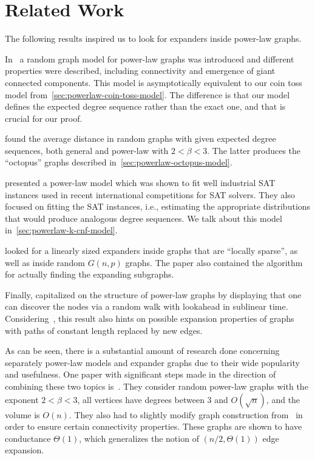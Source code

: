 \section{Related Work}

The following results inspired us to look for expanders inside power-law graphs.

In~\cite{acl01} a random graph model for power-law graphs was introduced
and different properties were described, including connectivity and emergence of giant connected components.
This model is asymptotically equivalent to our coin toss model from~\autoref{sec:powerlaw-coin-toss-model}.
The difference is that our model defines the expected degree sequence
rather than the exact one, and that is crucial for our proof.

\cite{cl04} found the average distance in random graphs
with given expected degree sequences, both general and power-law with $2<\beta<3$.
The latter produces the ``octopus'' graphs described in~\autoref{sec:powerlaw-octopus-model}.

\cite{abl09} presented a power-law model which was shown to fit well
industrial SAT instances used in recent international competitions for SAT solvers.
They also focused on fitting the SAT instances,
i.e., estimating the appropriate distributions that would produce analogous degree sequences.
We talk about this model in~\autoref{sec:powerlaw-k-cnf-model}.

\cite{kri17} looked for a linearly sized expanders inside graphs
that are ``locally sparse'', as well as inside random $G(n,p)$ graphs.
The paper also contained the algorithm for actually finding the expanding subgraphs.

Finally, \cite{mst06} capitalized on the structure of power-law graphs
by displaying that one can discover the nodes via a random walk
with lookahead in sublinear time.
Considering~\cite{mih89}, this result also hints on possible expansion
properties of graphs with paths of constant length replaced by new edges.

As can be seen, there is a substantial amount of research done concerning separately
power-law models and expander graphs due to their wide popularity and usefulness.
One paper with significant steps made in the direction
of combining these two topics is~\cite{gms03}.
They consider random power-law graphs with the exponent $2<\beta<3$,
all vertices have degrees between $3$ and $O(\sqrt{n})$, and the volume is $O(n)$.
They also had to slightly modify graph construction from~\cite{acl01}
in order to ensure certain connectivity properties.
These graphs are shown to have conductance $\Theta(1)$,
which generalizes the notion of $(n/2,\Theta(1))$ edge expansion.

